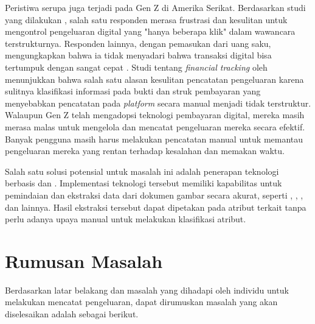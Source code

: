 Peristiwa serupa juga terjadi pada Gen Z di Amerika Serikat. Berdasarkan studi yang dilakukan \cite{lewis2019follow}, salah satu responden merasa frustrasi dan kesulitan untuk mengontrol pengeluaran digital yang "hanya beberapa klik" dalam wawancara terstrukturnya. Responden lainnya, dengan pemasukan dari uang saku, mengungkapkan bahwa ia tidak menyadari bahwa transaksi digital bisa tertumpuk dengan sangat cepat \parencite{lewis2019follow}. Studi tentang \emph{financial tracking} oleh \cite{kaye2014money} menunjukkan bahwa salah satu alasan kesulitan pencatatan pengeluaran karena sulitnya klasifikasi informasi pada bukti dan struk pembayaran yang menyebabkan pencatatan pada \emph{platform} secara manual menjadi tidak terstruktur. Walaupun Gen Z telah mengadopsi teknologi pembayaran digital, mereka masih merasa malas untuk mengelola dan mencatat pengeluaran mereka secara efektif. Banyak pengguna masih harus melakukan pencatatan manual untuk memantau pengeluaran mereka yang rentan terhadap kesalahan dan memakan waktu.


Salah satu solusi potensial untuk masalah ini adalah penerapan teknologi berbasis \cvfull{} dan \dl{}. Implementasi teknologi tersebut memiliki kapabilitas untuk pemindaian dan ekstraksi data dari dokumen gambar secara akurat, seperti \ocrfull, \cnnfull, \transformer, dan lainnya. Hasil ekstraksi tersebut dapat dipetakan pada atribut terkait tanpa perlu adanya upaya manual untuk melakukan klasifikasi atribut.


\section{Rumusan Masalah}
\label{sec:rumusan-masalah}

Berdasarkan latar belakang dan masalah yang dihadapi oleh individu untuk melakukan mencatat pengeluaran, dapat dirumuskan masalah yang akan diselesaikan adalah sebagai berikut.

